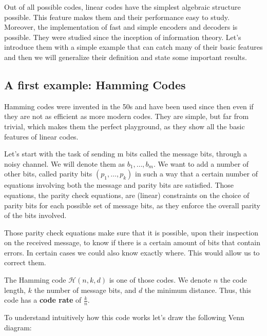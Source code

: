 Out of all possible codes, linear codes have the simplest algebraic structure possible. This feature makes them and their performance easy to study. Moreover, the implementation of fast and simple encoders and decoders is possible. They were studied since the inception of information theory. Let's introduce them with a simple example that can catch many of their basic features and then we will generalize their definition and state some important results.

\subsection{A first example: Hamming Codes}
Hamming codes were invented in the 50s and have been used since then even if they are not as efficient as more modern codes. They are simple, but far from trivial, which makes them the perfect playground, as they show all the basic features of linear codes.

Let's start with the task of sending m bits called the message bits, through a noisy channel. We will denote them as $b_1, \dots, b_m$. We want to add a number of other bits, called parity bits $(p_1, \dots, p_k)$ in such a way that a certain number of equations involving both the message and parity bits are satisfied. Those equations, the parity check equations, are (linear) constraints on the choice of parity bits for each possible set of message bits, as they enforce the overall parity of the bits involved.

Those parity check equations make sure that it is possible, upon their inspection on the received message, to know if there is a certain amount of bits that contain errors. In certain cases we could also know exactly where. This would allow us to correct them.

The Hamming code $\mathcal{H}(n, k, d)$ is one of those codes. We denote $n$ the code length, $k$ the number of message bits, and $d$ the minimum distance.
Thus, this code has a \textbf{code rate} of $\frac{k}{n}$.

To understand intuitively how this code works let's draw the following Venn diagram:
\def\firstcircle{(90:1.75cm) circle (2.5cm)}
\def\secondcircle{(210:1.75cm) circle (2.5cm)}
\def\thirdcircle{(330:1.75cm) circle (2.5cm)}
\begin{center}
\end{center}

